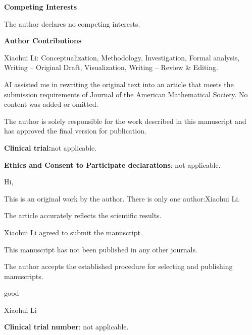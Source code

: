 \documentclass[11pt,a4paper]{article}
\begin{document}
 \textbf{\textbf{Competing Interests}}

The author declares no competing interests.

 \textbf{\textbf{Author Contributions}}

Xiaohui Li: Conceptualization, Methodology, Investigation, Formal analysis, Writing – Original Draft, Visualization, Writing – Review \& Editing.

AI assisted me in rewriting the original text into an article that meets the submission requirements of Journal of the American Mathematical Society. No content was added or omitted.

 The author is solely responsible for the work described in this manuscript and has approved the final version for publication.

 \textbf{\textbf{Clinical trial:}}not applicable.

 \textbf{\textbf{Ethics and Consent to Participate declarations}}: not applicable.

 Hi,

This is an original work by the author. There is only one author:Xiaohui Li.

The article accurately reflects the scientific results.

Xiaohui Li agreed to submit the manuscript.

This manuscript has not been published in any other journals.

The author accepts the established procedure for selecting and publishing manuscripts.

good

Xiaohui Li



 \textbf{\textbf{Clinical trial number}}: not applicable.

\end{document}
